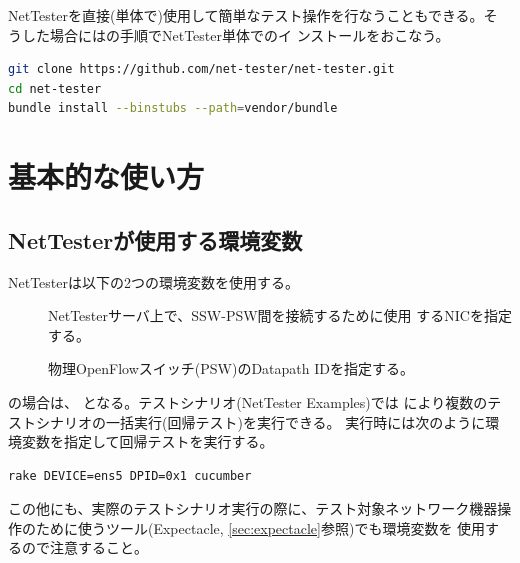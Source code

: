NetTesterを直接(単体で)使用して簡単なテスト操作を行なうこともできる。そ
うした場合にはの手順でNetTester単体でのイ
ンストールをおこなう。

\begin{lstlisting}[language=sh,caption=NetTesterのインストール,label=lst:install-nettester]
git clone https://github.com/net-tester/net-tester.git
cd net-tester
bundle install --binstubs --path=vendor/bundle
\end{lstlisting}

 \section{基本的な使い方}
 \label{sec:basic-usage}

  \subsection{NetTesterが使用する環境変数}
  \label{sec:nettester-envvar}

NetTesterは以下の2つの環境変数を使用する。
\begin{description}
 \item[] NetTesterサーバ上で、SSW-PSW間を接続するために使用
            するNICを指定する。
 \item[] 物理OpenFlowスイッチ(PSW)のDatapath IDを指定する。
\end{description}

の場合は、
となる。テストシナリオ(NetTester Examples)では
により複数のテストシナリオの一括実行(回帰テスト)を実行できる。
実行時には次のように環境変数を指定して回帰テストを実行する。
\begin{lstlisting}[title=回帰テスト実行時の環境変数指定]
rake DEVICE=ens5 DPID=0x1 cucumber
\end{lstlisting}

この他にも、実際のテストシナリオ実行の際に、テスト対象ネットワーク機器操
作のために使うツール(Expectacle, \ref{sec:expectacle}参照)でも環境変数を
使用するので注意すること。

